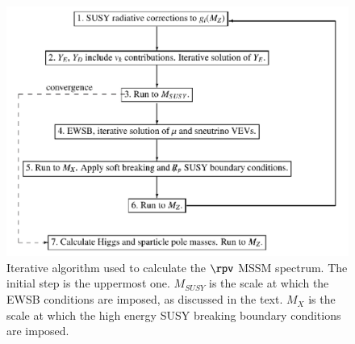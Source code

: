 \documentclass[final,3p,times,pdflatex]{elsarticle}
\begin{document}
\begin{figure}
\begin{center}
\includegraphics[width=330pt]{rpvalg}
\end{center}
\caption{Iterative algorithm used to calculate the $\rpv$ MSSM spectrum. 
The initial step is the
uppermost one. $M_{SUSY}$ is the scale at which the EWSB
conditions 
are imposed, as discussed in the text. $M_X$ is the scale at which the high
energy SUSY breaking boundary conditions are imposed.
\label{fig:algorithm}}
\end{figure}
\end{document}
